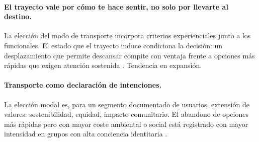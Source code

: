 \paragraph{El trayecto vale por cómo te hace sentir,
no solo por llevarte al destino.}
La elección del modo de transporte incorpora criterios
experienciales junto a los funcionales. El estado que el
trayecto induce condiciona la decisión: un desplazamiento
que permite descansar compite con ventaja frente a opciones
más rápidas que exigen atención sostenida
\parencite{TrendHunter2026}. Tendencia en expansión.

\paragraph{Transporte como declaración de intenciones.}
La elección modal es, para un segmento documentado de
usuarios, extensión de valores: sostenibilidad, equidad,
impacto comunitario. El abandono de opciones más rápidas
pero con mayor coste ambiental o social está registrado
con mayor intensidad en grupos con alta conciencia
identitaria \parencite{Autodesk2026}.


